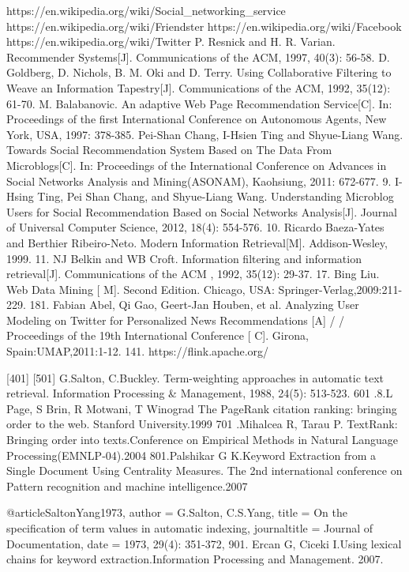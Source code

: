 https://en.wikipedia.org/wiki/Social_networking_service
https://en.wikipedia.org/wiki/Friendster
https://en.wikipedia.org/wiki/Facebook
https://en.wikipedia.org/wiki/Twitter
 P.  Resnick  and  H.  R.  Varian.  Recommender  Systems[J].  Communications  of  the  ACM, 1997, 40(3): 56-58. 
D. Goldberg, D. Nichols, B. M. Oki and D. Terry. Using Collaborative Filtering to Weave an Information Tapestry[J]. Communications of the ACM, 1992, 35(12): 61-70. 
 M. Balabanovic. An adaptive Web Page Recommendation Service[C]. In: Proceedings of the  first  International  Conference  on  Autonomous  Agents,  New  York,  USA,  1997: 378-385. 
 Pei-Shan Chang, I-Hsien Ting and Shyue-Liang Wang. Towards Social Recommendation System  Based  on  The  Data  From  Microblogs[C].  In:  Proceedings  of  the  International Conference  on  Advances  in  Social  Networks  Analysis  and  Mining(ASONAM), Kaohsiung, 2011: 672-677. 
     9.   I-Hsing Ting, Pei Shan Chang, and Shyue-Liang Wang. Understanding Microblog Users for Social Recommendation Based on Social Networks Analysis[J]. Journal of Universal Computer Science, 2012, 18(4): 554-576. 
  10. Ricardo  Baeza-Yates  and  Berthier  Ribeiro-Neto.  Modern  Information  Retrieval[M]. 
Addison-Wesley, 1999. 
    11. NJ  Belkin  and  WB  Croft.  Information  filtering  and  information  retrieval[J].  
Communications of the ACM , 1992, 35(12): 29-37. 
17. Bing Liu. Web Data Mining [ M]. Second Edition. Chicago, USA: Springer-Verlag,2009:211-229.
181. Fabian Abel, Qi Gao, Geert-Jan Houben, et al. Analyzing User Modeling on Twitter for Personalized News Recommendations [A] / / Proceedings of the 19th International Conference [ C]. Girona, Spain:UMAP,2011:1-12.
141. https://flink.apache.org/

[401] 
[501] G.Salton, C.Buckley. Term-weighting approaches in automatic text retrieval. Information Processing & Management, 1988, 24(5): 513-523.
601 .8.L Page, S Brin, R Motwani, T Winograd The PageRank citation ranking: bringing order to the web. Stanford University.1999
701 .Mihalcea R, Tarau P. TextRank: Bringing order into texts.Conference on Empirical Methods in Natural Language Processing(EMNLP-04).2004
801.Palshikar G K.Keyword Extraction from a Single Document Using Centrality Measures. The 2nd international conference on Pattern recognition and machine intelligence.2007

@article{SaltonYang1973,
	author = {G.Salton, C.S.Yang},
	title = {On the specification of term values in automatic indexing},
	journaltitle = {Journal of Documentation},
	date = {1973, 29(4): 351-372},
}
901. Ercan G, Ciceki I.Using lexical chains for keyword extraction.Information Processing and Management. 2007.